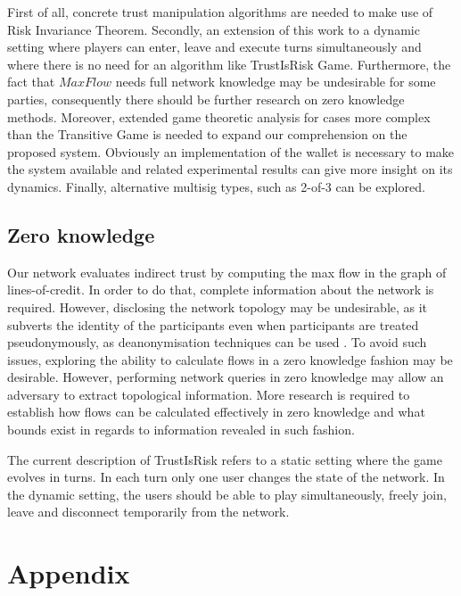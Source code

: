 \documentclass[11pt]{llncs}
\theoremstyle{definition}
\begin{document}
     First of all, concrete trust manipulation algorithms are needed to make use of Risk Invariance Theorem. Secondly, an
     extension of this work to a dynamic setting where players can enter, leave and execute turns simultaneously and where
     there is no need for an algorithm like TrustIsRisk Game. Furthermore, the fact that $MaxFlow$ needs full network
     knowledge may be undesirable for some parties, consequently there should be further research on zero knowledge methods.
     Moreover, extended game theoretic analysis for cases more complex than the Transitive Game is needed to expand our
     comprehension on the proposed system. Obviously an implementation of the wallet is necessary to make the system
     available and related experimental results can give more insight on its dynamics. Finally, alternative multisig types,
     such as 2-of-3 can be explored.

  \subsection{Zero knowledge}
     Our network evaluates indirect trust by computing the max flow in the graph of lines-of-credit. In order to do that,
     complete information about the network is required. However, disclosing the network topology may be undesirable, as it
     subverts the identity of the participants even when participants are treated pseudonymously, as deanonymisation
     techniques can be used \cite{deanonymisation}. To avoid such issues, exploring the ability to calculate flows in a zero
     knowledge fashion may be desirable. However, performing network queries in zero knowledge may allow an adversary to
     extract topological information. More research is required to establish how flows can be calculated effectively in zero
     knowledge and what bounds exist in regards to information revealed in such fashion.

     The current description of TrustIsRisk refers to a static setting where the game evolves in turns. In each turn only one
     user changes the state of the network. In the dynamic setting, the users should be able to play simultaneously, freely
     join, leave and disconnect temporarily from the network.

  \section*{Appendix}
\end{document}
